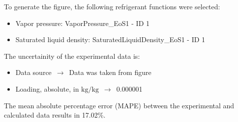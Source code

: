 To generate the figure, the following refrigerant functions were selected:
\begin{itemize}
\item Vapor pressure: VaporPressure\_EoS1 - ID 1
\item Saturated liquid density: SaturatedLiquidDensity\_EoS1 - ID 1
\end{itemize}

The uncertainity of the experimental data is:
\begin{itemize}
\item Data source $\,\to\,$ Data was taken from figure
\item Loading, absolute, in $\si{\kilogram\per\kilogram}$ $\,\to\,$ 0.000001
\end{itemize}

The mean absolute percentage error (MAPE) between the experimental and calculated data results in 17.02\%.
\FloatBarrier
\newpage
